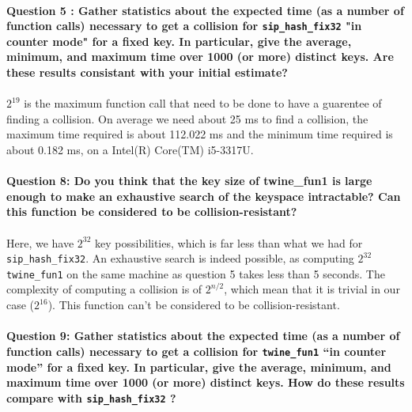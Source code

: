 \documentclass[4apaper]{report}
\begin{document}
\paragraph{Question 5 : Gather statistics about the expected time (as a number of function calls) necessary to get a
collision for \texttt{sip\_hash\_fix32} "in counter mode" for a fixed key. In particular, give the average, minimum, and maximum time over 1000 (or more) distinct keys. Are these results consistant
with your initial estimate?}

\paragraph{} $2^{19}$ is the maximum function call that need to be done to have a guarentee of finding a collision. On average we need about 25 ms to find a collision, the maximum time required is about 112.022 ms and the minimum time required is about 0.182 ms, on a Intel(R) Core(TM) i5-3317U.

\paragraph{Question 8: Do you think that the key size of twine\_fun1 is large enough to make an exhaustive search of
the keyspace intractable? Can this function be considered to be collision-resistant?}

\paragraph{} Here, we have $2^{32}$ key possibilities, which is far less than what we had for \texttt{sip\_hash\_fix32}. An exhaustive search is indeed possible, as computing $2^{32}$ \texttt{twine\_fun1} on the same machine as question 5 takes less than 5 seconds. The complexity of computing a collision is of $2^{n/2}$, which mean that it is trivial in our case ($2^{16}$). This function can't be considered to be collision-resistant.

\paragraph{Question 9: Gather statistics about the expected time (as a number of function calls) necessary to get a
collision for \texttt{twine\_fun1} “in counter mode” for a fixed key. In particular, give the average, minimum, and maximum time over 1000 (or more) distinct keys. How do these results compare with \texttt{sip\_hash\_fix32} ?}
\end{document}
